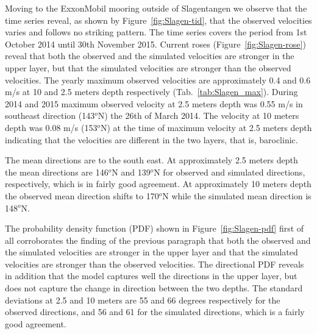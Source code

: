 
Moving to the ExxonMobil mooring outside of Slagentangen we observe that the time series reveal, as shown by Figure~\ref{fig:Slagen-tid}, that the observed velocities varies and follows no striking pattern. The time series covers the period from 1st October 2014 until 30th November 2015. Current roses (Figure~\ref{fig:Slagen-rose}) reveal that both the observed and the simulated velocities are stronger in the upper layer, but that the simulated velocities are stronger than the observed velocities. The yearly maximum observed velocities are approximately 0.4 and 0.6 m/s at 10 and 2.5 meters depth respectively (Tab.~\ref{tab:Slagen_max}). During 2014 and 2015 maximum observed velocity at 2.5 meters depth was 0.55 m/s in southeast direction (143$^o$N) the 26th of March 2014. The velocity at 10 meters depth was 0.08 m/s (153$^o$N) at the time of maximum velocity at 2.5 meters depth indicating that the velocities are different in the two layers, that is, baroclinic.




The mean directions are to the south east. At approximately 2.5 meters depth the mean directions are 146$^o$N and 139$^o$N for observed and simulated directions, respectively, which is in fairly good agreement. At approximately 10 meters depth the observed mean direction shifts to 170$^o$N while the simulated mean direction is 148$^o$N. 

The probability density function (PDF) shown in Figure~\ref{fig:Slagen-pdf} first of all corroborates the finding of the previous paragraph that both the observed and the simulated velocities are stronger in the upper layer and that the simulated velocities are stronger than the observed velocities. The directional PDF reveals in addition that the model captures well the directions in the upper layer, but does not capture the change in direction between the two depths. The standard deviations at 2.5 and 10 meters are 55 and 66 degrees respectively for the observed directions, and 56 and 61 for the simulated directions, which is a fairly good agreement.


